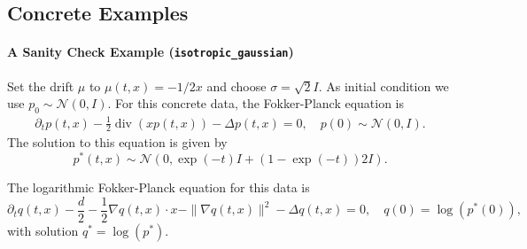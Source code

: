 \subsection{Concrete Examples}
\paragraph{A Sanity Check Example (\texttt{isotropic\_gaussian})}
Set the drift $\mu$ to $\mu(t,x) = -1/2x$ and choose $\sigma=\sqrt 2 I$. As initial condition we use $p_0 \sim \mathcal N(0,I)$. For this concrete data, the Fokker-Planck equation is
\begin{align}\label{eq:fokker_planck_sanity_example}
    \partial_t p(t, x)
    -
    \frac12 \operatorname{div}(xp(t,x))
    -
    \Delta p(t,x)
    =
    0,
    \quad 
    p(0) \sim \mathcal N(0, I).
\end{align}
The solution to this equation is given by
\begin{equation}
    p^*(t, x) \sim \mathcal N(0, \exp(-t)I + (1 - \exp(-t)) 2 I).
\end{equation}

The logarithmic Fokker-Planck equation for this data is 
\begin{equation}
    \partial_t q(t,x)
    -
    \frac d2
    -
    \frac12\nabla q(t,x)\cdot x
    -
    \| \nabla q(t,x) \|^2
    -
    \Delta q(t,x)
    =
    0,
    \quad 
    q(0) = \log(p^*(0)),
\end{equation}
with solution $q^* = \log(p^*)$.

